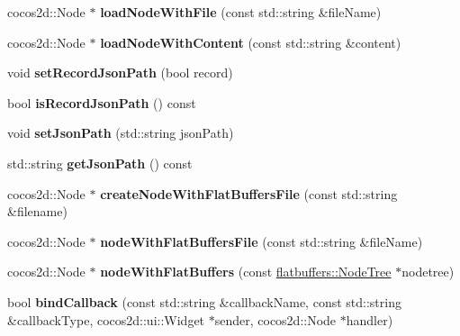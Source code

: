 \begin{DoxyCompactItemize}
cocos2d\+::\+Node $\ast$ {\bfseries load\+Node\+With\+File} (const std\+::string \&file\+Name)
\item 
\mbox{\label{classCSLoader_a3f075c7b52001310bba7eecc9211b265}} 
cocos2d\+::\+Node $\ast$ {\bfseries load\+Node\+With\+Content} (const std\+::string \&content)
\item 
\mbox{\label{classCSLoader_a4a1296340a51d43ebb9e7339fdb4b45f}} 
void {\bfseries set\+Record\+Json\+Path} (bool record)
\item 
\mbox{\label{classCSLoader_ae925dbfcc8ddee4242803751c717d7d7}} 
bool {\bfseries is\+Record\+Json\+Path} () const
\item 
\mbox{\label{classCSLoader_a4adb303625952ffa42ff5d8476760e86}} 
void {\bfseries set\+Json\+Path} (std\+::string json\+Path)
\item 
\mbox{\label{classCSLoader_a8231ac76775b453241c4568c43139da8}} 
std\+::string {\bfseries get\+Json\+Path} () const
\item 
\mbox{\label{classCSLoader_a4917e86fc17d65e281a382c72c1ceaa2}} 
cocos2d\+::\+Node $\ast$ {\bfseries create\+Node\+With\+Flat\+Buffers\+File} (const std\+::string \&filename)
\item 
\mbox{\label{classCSLoader_a307dfaf79df71119285788247241fbcc}} 
cocos2d\+::\+Node $\ast$ {\bfseries node\+With\+Flat\+Buffers\+File} (const std\+::string \&file\+Name)
\item 
\mbox{\label{classCSLoader_a6d3e9dfb45df3c8a73744bc28dc6c77b}} 
cocos2d\+::\+Node $\ast$ {\bfseries node\+With\+Flat\+Buffers} (const \hyperlink{structflatbuffers_1_1NodeTree}{flatbuffers\+::\+Node\+Tree} $\ast$nodetree)
\item 
\mbox{\label{classCSLoader_a8f9c027f62844f9279eff4e40a6ebc9a}} 
bool {\bfseries bind\+Callback} (const std\+::string \&callback\+Name, const std\+::string \&callback\+Type, cocos2d\+::ui\+::\+Widget $\ast$sender, cocos2d\+::\+Node $\ast$handler)
\item 
\mbox{\label{classCSLoader_a6489d9b3a2b2e8eed76269d46dd28af2}} 

\end{DoxyCompactItemize}
